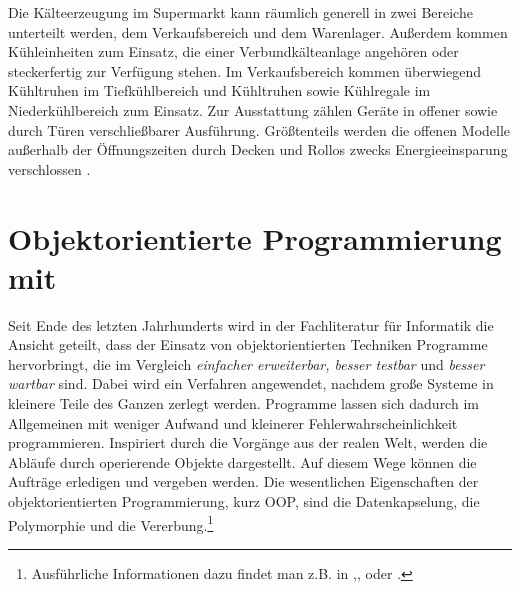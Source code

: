 Die K\"alteerzeugung im Supermarkt kann r\"aumlich generell in zwei Bereiche
unterteilt werden, dem Verkaufsbereich und dem Warenlager. Au\ss erdem kommen
K\"uhleinheiten zum Einsatz, die einer Verbundk\"alteanlage angeh\"oren oder
steckerfertig zur Verf\"ugung stehen. Im Verkaufsbereich kommen \"uberwiegend
K\"uhltruhen im Tiefk\"uhlbereich und K\"uhltruhen sowie K\"uhlregale im
Niederk\"uhlbereich zum Einsatz. Zur Ausstattung z\"ahlen Ger\"ate in offener
sowie durch T\"uren verschlie\ss barer Ausf\"uhrung. Gr\"o\ss tenteils werden
die offenen Modelle au\ss erhalb der \"Offnungszeiten durch Decken und Rollos
zwecks Energieeinsparung verschlossen \cite{leghart}.


\section{Objektorientierte Programmierung mit \matlab}
\label{sec:OOP}
Seit Ende des letzten Jahrhunderts wird in der Fachliteratur für Informatik
die Ansicht geteilt, dass der Einsatz von objektorientierten Techniken Programme
hervorbringt, die im Vergleich \textit{einfacher erweiterbar, besser testbar}
und \textit{besser wartbar} sind. Dabei wird ein Verfahren angewendet, nachdem
große Systeme in kleinere Teile des Ganzen zerlegt werden. Programme lassen sich
dadurch im Allgemeinen mit weniger Aufwand und kleinerer
Fehlerwahrscheinlichkeit programmieren. Inspiriert durch die Vorgänge aus der
realen Welt, werden die Abläufe durch operierende Objekte dargestellt. Auf
diesem Wege k\"onnen die Aufträge erledigen und vergeben werden. Die
wesentlichen Eigenschaften der objektorientierten Programmierung, kurz
OOP, sind die Datenkapselung, die
Polymorphie und die Vererbung.\footnote{ Ausführliche Informationen dazu findet
man z.B. in \cite{OOP},\cite{pepperOOP},\cite{java} oder \cite{python}.}


